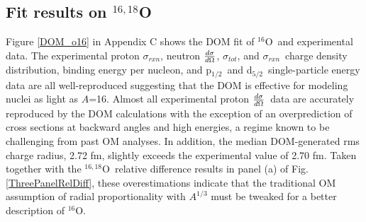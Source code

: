 \documentclass[twocolumn,secnumarabic,amssymb, nobibnotes, aps, prl,
superscriptaddress, nobalancelastpage, floatfix]{revtex4}
\newcommand{\tot}{\ensuremath{\sigma_{tot}}}
\newcommand{\rxn}{\ensuremath{\sigma_{rxn}}}
\newcommand{\el}{\ensuremath{\frac{\lowercase{d}\sigma}{\lowercase{d}\Omega}}}
\newcommand{\oSix}{\ensuremath{^{16}}O}
\newcommand{\oSixEight}{\ensuremath{^{16,18}}O}
\newcommand{\pOne}{p\ensuremath{_{1/2}}}
\newcommand{\dFive}{d\ensuremath{_{5/2}}}
\begin{document}

\subsection{Fit results on $^{16,18}$O}
Figure \ref{DOM_o16} in Appendix C shows
the DOM fit of \oSix\ and experimental data. The experimental proton \rxn, neutron \el, \tot, 
and \rxn\, charge density distribution, binding energy per nucleon,
and \pOne\ and \dFive\ single-particle energy data are all well-reproduced
suggesting that the DOM is effective for modeling nuclei as light as $A$=16.
Almost all experimental proton \el\ data are accurately reproduced by the DOM
calculations with the exception of an overprediction of cross sections
at backward angles and high energies, a regime known to be challenging from past
OM analyses. In addition, the median DOM-generated rms charge radius, 2.72 fm, slightly exceeds
the experimental value of 2.70 fm. Taken together with the \oSixEight\ relative difference results in
panel (a) of Fig. \ref{ThreePanelRelDiff}, these overestimations indicate that the traditional OM assumption of radial
proportionality with $A^{1/3}$ must be tweaked for a better description of \oSix.
\end{document}
